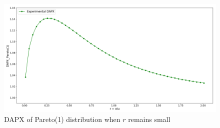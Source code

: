 \begin{figure}[H]
	\centering
	\includegraphics[width=1\textwidth]{pareto_dapx2}
	\caption{DAPX of Pareto(1) distribution when $r$ remains small}
	\label{fig:pareto_dapx2}
\end{figure}



